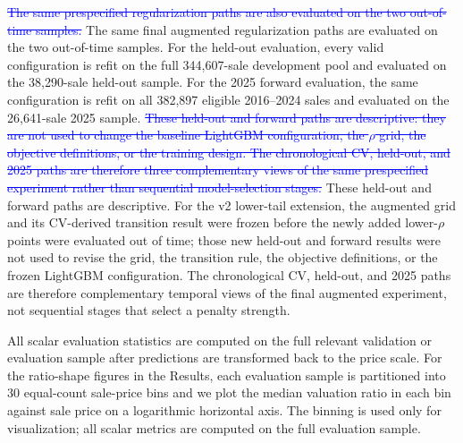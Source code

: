 \documentclass[10pt]{article}
\theoremstyle{definition}
\newcommand{\1}{\mathbf{1}}
\newcommand{\oldtext}[1]{\textcolor{blue}{\sout{#1}}}
\newcommand{\latesttext}[1]{\textcolor{latestPurple}{#1}}
\begin{document}
\oldtext{The same prespecified regularization paths are also evaluated on the two out-of-time samples.}
\latesttext{The same final augmented regularization paths are evaluated on the two out-of-time samples.} For the held-out evaluation, every valid configuration is refit on the full
344,607-sale development pool and evaluated on the 38,290-sale held-out sample. For
the 2025 forward evaluation, the same configuration is refit on all 382,897 eligible
2016--2024 sales and evaluated on the 26,641-sale 2025 sample. \oldtext{These held-out and forward paths are descriptive: they are not used to change the baseline LightGBM configuration, the $\rho$ grid, the objective definitions, or the training design. The chronological CV, held-out, and 2025 paths are therefore three complementary views of the same prespecified experiment rather than sequential model-selection stages.}
\latesttext{These held-out and forward paths are descriptive. For the v2 lower-tail extension, the augmented grid and its CV-derived transition result were frozen before the newly added lower-$\rho$ points were evaluated out of time; those new held-out and forward results were not used to revise the grid, the transition rule, the objective definitions, or the frozen LightGBM configuration. The chronological CV, held-out, and 2025 paths are therefore complementary temporal views of the final augmented experiment, not sequential stages that select a penalty strength.}

All scalar evaluation statistics are computed on the full relevant validation or
evaluation sample after predictions are transformed back to the price scale. For
the ratio-shape figures in the Results, each evaluation sample is partitioned into
30 equal-count sale-price bins and we plot the median valuation ratio in each bin
against sale price on a logarithmic horizontal axis. The binning is used only for
visualization; all scalar metrics are computed on the full evaluation sample.
\end{document}
